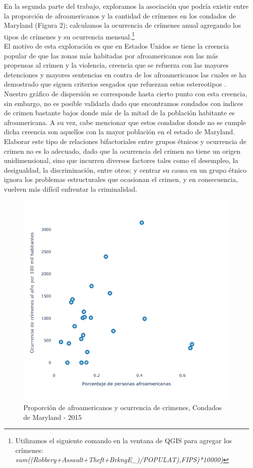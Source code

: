 \documentclass[11pt,a4paper]{article}
\begin{document}
En la segunda parte del trabajo, exploramos la asociación que podría existir entre la proporción de afroamericanos y la cantidad de crímenes en los condados de Maryland (Figura 2); calculamos la ocurrencia de crímenes anual agregando los tipos de crímenes y su ocurrencia mensual.\footnote{Utilizamos el siguiente comando en la ventana de QGIS para agregar los crímenes: \emph{sum((Robbery+Assault+Theft+BrkngE\_)/POPULAT),FIPS)*10000)}
}
\\
El motivo de esta exploración es que en Estados Unidos se tiene la creencia popular de que las zonas más habitadas por afroamericanos son las más propensas al crimen y la violencia, creencia que se refuerza con las mayores detenciones y mayores sentencias en contra de los afroamericanos las cuales se ha demostrado que  siguen criterios sesgados que refuerzan estos estereotipos . Nuestro gráfico de dispersión se corresponde hasta cierto punto con esta creencia, sin embargo, no es posible validarla dado que encontramos condados con indices de crimen bastante bajos donde más de la mitad de la población habitante es afroamericana. A su vez, cabe mencionar que estos condados donde no se cumple dicha creencia son aquellos con la mayor población en el estado de Maryland.
\\
Elaborar este tipo de relaciones bifactoriales entre grupos étnicos y ocurrencia de crimen no es lo adecuado, dado que la ocurrencia del crimen no tiene un origen unidimensional, sino que incurren diversos factores tales como el desempleo, la desigualdad, la discriminación, entre otros; y centrar su causa en un grupo étnico ignora los problemas estructurales que ocasionan el crimen, y en consecuencia, vuelven más difícil enfrentar la criminalidad.

\begin{figure}[!h]
    \centering
    \includegraphics[width=12cm]{Graph/part2 graph1.png}
   \caption{Proporción de afroamericanos y ocurrencia de crimenes, Condados de Maryland - 2015}
    \label{fig:my_label}
\end{figure}

\printbibliography
\end{document}
